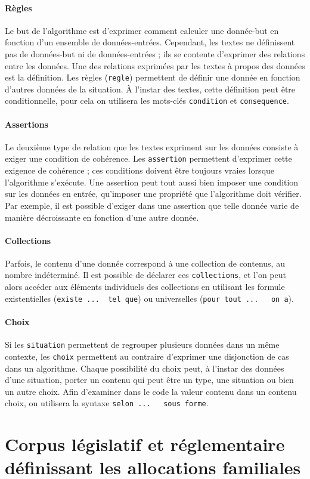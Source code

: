 \documentclass[11pt, french]{article}
\begin{document}
\paragraph{Règles} Le but de l'algorithme est d'exprimer comment calculer une donnée-but en fonction d'un ensemble de données-entrées. Cependant, les textes ne définissent pas de données-but ni de données-entrées ; ils se contente d'exprimer des relations entre les données. Une des relations exprimées par les textes à propos des données est la définition. Les règles (\lstinline|regle|) permettent de définir une donnée en fonction d'autres données de la situation. À l'instar des textes, cette définition peut être conditionnelle, pour cela on utilisera les mots-clés \lstinline|condition| et \lstinline|consequence|.

\paragraph{Assertions} Le deuxième type de relation que les textes expriment sur les données consiste à exiger une condition de cohérence. Les \lstinline|assertion| permettent d'exprimer cette exigence de cohérence ; ces conditions doivent être toujours vraies lorsque l'algorithme s'exécute. Une assertion peut tout aussi bien imposer une condition sur les données en entrée, qu'imposer une propriété que l'algorithme doit vérifier. Par exemple, il est possible d'exiger dans une assertion que telle donnée varie de manière décroissante en fonction d'une autre donnée.

\paragraph{Collections} Parfois, le contenu d'une donnée correspond à une collection de contenus, au nombre indéterminé. Il est possible de déclarer ces \lstinline|collections|, et l'on peut alors accéder aux éléments individuels des collections en utilisant les formule existentielles (\lstinline|existe ...  tel que|) ou universelles (\lstinline|pour tout ...   on a|).

\paragraph{Choix} Si les \lstinline|situation| permettent de regrouper plusieurs données dans un même contexte, les \lstinline|choix| permettent au contraire d'exprimer une disjonction de cas dans un algorithme. Chaque possibilité du choix peut, à l'instar des données d'une situation, porter un contenu qui peut être un type, une situation ou bien un autre choix. Afin d'examiner dans le code la valeur contenu dans un contenu choix, on utilisera la syntaxe \lstinline|selon ...   sous forme|.



\section{Corpus législatif et réglementaire définissant les allocations familiales}


\end{document}
